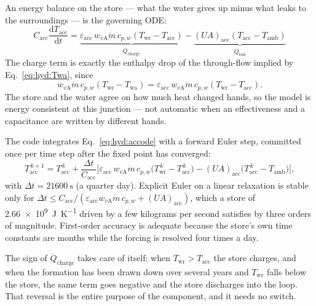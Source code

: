 \documentclass[11pt]{article}
\newcommand{\md}{\ensuremath{\dot m}}
\newcommand{\UA}{\ensuremath{U\!A}}
\begin{document}
An energy balance on the store --- what the water gives up minus what leaks to the surroundings
--- is the governing ODE:
\begin{equation}
\boxed{\;
C_{\mathrm{acc}}\frac{\mathrm{d}T_{\mathrm{acc}}}{\mathrm{d}t}
=\underbrace{\varepsilon_{\mathrm{acc}}\,w_{v\mathrm{A}}\md\,c_{p,w}
\left(T_{\mathrm{wr}}-T_{\mathrm{acc}}\right)}_{\dot Q_{\mathrm{charge}}}
-\underbrace{(\UA)_{\mathrm{acc}}\left(T_{\mathrm{acc}}-T_{\mathrm{amb}}\right)}
_{\dot Q_{\mathrm{loss}}}\;}
\label{eq:hyd:accode}
\end{equation}
The charge term is exactly the enthalpy drop of the through-flow implied by
Eq.~\eqref{eq:hyd:Twa}, since
\begin{equation*}
w_{v\mathrm{A}}\md\,c_{p,w}\left(T_{\mathrm{wr}}-T_{\mathrm{wa}}\right)
=\varepsilon_{\mathrm{acc}}\,w_{v\mathrm{A}}\md\,c_{p,w}
\left(T_{\mathrm{wr}}-T_{\mathrm{acc}}\right).
\end{equation*}
The store and the water agree on how much heat changed hands, so the model is energy consistent
at this junction --- not automatic when an effectiveness and a capacitance are written by
different hands.

The code integrates Eq.~\eqref{eq:hyd:accode} with a forward Euler step, committed once per
time step after the fixed point has converged:
\begin{equation}
T_{\mathrm{acc}}^{\,k+1}=T_{\mathrm{acc}}^{\,k}
+\frac{\Delta t}{C_{\mathrm{acc}}}
\Big[\varepsilon_{\mathrm{acc}}\,w_{v\mathrm{A}}\md\,c_{p,w}
\big(T_{\mathrm{wr}}^{\,k}-T_{\mathrm{acc}}^{\,k}\big)
-(\UA)_{\mathrm{acc}}\big(T_{\mathrm{acc}}^{\,k}-T_{\mathrm{amb}}\big)\Big],
\label{eq:hyd:accupdate}
\end{equation}
with $\Delta t=\SI{21600}{\second}$ (a quarter day). Explicit Euler on a linear relaxation is
stable only for $\Delta t\le C_{\mathrm{acc}}/
(\varepsilon_{\mathrm{acc}}w_{v\mathrm{A}}\md\,c_{p,w}+(\UA)_{\mathrm{acc}})$, which a store of
\SI{2.66e9}{\joule\per\kelvin} driven by a few kilograms per second satisfies by three orders
of magnitude. First-order accuracy is adequate because the store's own time constants are
months while the forcing is resolved four times a day.

The sign of $\dot Q_{\mathrm{charge}}$ takes care of itself: when
$T_{\mathrm{wr}}>T_{\mathrm{acc}}$ the store charges, and when the formation has been drawn
down over several years and $T_{\mathrm{wr}}$ falls below the store, the same term goes
negative and the store discharges into the loop. That reversal is the entire purpose of the
component, and it needs no switch.
\end{document}
